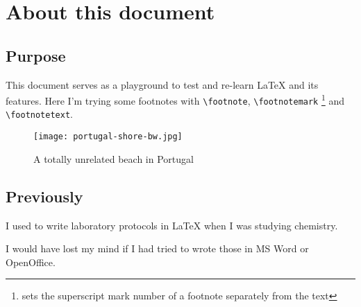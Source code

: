 \documentclass[latex-playground.tex]{subfiles}
\begin{document}
\chapter{About this document}
\section{Purpose}

This document serves as a playground to test and re-learn\footnotemark{} \LaTeX{} and its features.
Here I'm trying some footnotes with \verb=\footnote=, \verb=\footnotemark=
\footnote{sets the superscript mark number of a footnote separately from the text}
and \verb=\footnotetext=\footnotemark.

\begin{figure}[h]
  \texttt{[image: portugal-shore-bw.jpg]}
  \caption{A totally unrelated beach in Portugal}
  \centering
\end{figure}

\section{Previously}

I used to write laboratory protocols in \LaTeX{} when I was studying chemistry.

I would have lost my mind if I had tried to wrote those in MS Word or OpenOffice.
\end{document}
